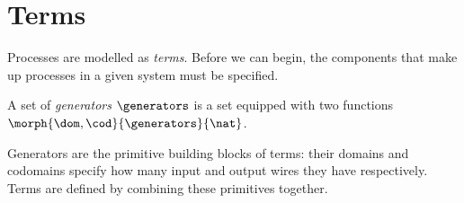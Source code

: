 \section{Terms}

Processes are modelled as \emph{terms}.
Before we can begin, the components that make up processes in a given system
must be specified.

\begin{definition}[Generators]
    A set of \emph{generators} \(\generators\) is a set equipped with two
    functions \(\morph{\dom,\cod}{\generators}{\nat}\).
\end{definition}

Generators are the primitive building blocks of terms: their domains and
codomains specify how many input and output wires they have respectively.
Terms are defined by combining these primitives together.

